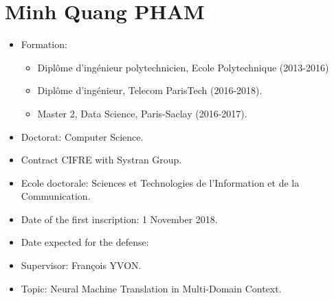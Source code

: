\documentclass[11pt, letterpaper]{article}
\begin{document}
\setlength{\belowdisplayskip}{3pt} \setlength{\belowdisplayshortskip}{3pt}
\setlength{\abovedisplayskip}{3pt} \setlength{\abovedisplayshortskip}{3pt}
\setlength{\parskip}{0.1cm}
\setlength{\parindent}{1em}
\section*{Minh Quang PHAM}
\begin{itemize}
	\item Formation: 
		\begin{itemize}
			\item Diplôme d'ingénieur polytechnicien, Ecole Polytechnique (2013-2016)
			\item Diplôme d'ingénieur, Telecom ParisTech (2016-2018).
			\item Master 2, Data Science, Paris-Saclay (2016-2017).
		\end{itemize}  
	\item Doctorat: Computer Science.
	\item Contract CIFRE  with Systran Group.
	\item Ecole doctorale: Sciences et Technologies de l'Information et de la Communication.
	\item Date of the first inscription: 1 November 2018.
	\item Date expected for the defense: 
	\item Supervisor: François YVON.
	\item Topic: Neural Machine Translation in Multi-Domain Context.
\end{itemize}
\end{document}

